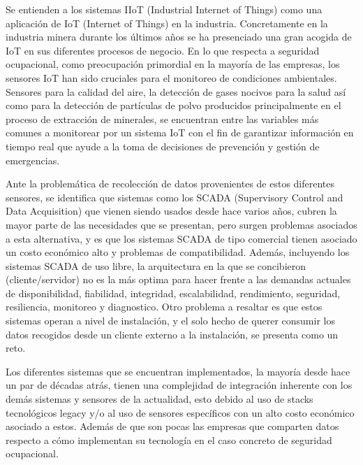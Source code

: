 \documentclass[stu,12pt,floatsintext]{apa7}
\begin{document}
	Se entienden a los sistemas IIoT (Industrial Internet of Things) como una aplicación de IoT (Internet of Things) en la industria. Concretamente en la industria minera durante los últimos años se ha presenciado una gran acogida de IoT en sus diferentes procesos de negocio. En lo que respecta a seguridad ocupacional, como preocupación primordial en la mayoría de las empresas,  los sensores IoT han sido cruciales para el monitoreo de condiciones ambientales. Sensores para la calidad del aire, la detección de gases nocivos para la salud así como para la detección de partículas de polvo producidos principalmente en el proceso de extracción de minerales, se encuentran entre las variables más comunes a monitorear por un sistema IoT con el fin de garantizar información en tiempo real que ayude a la toma de decisiones de prevención y gestión de emergencias\cite{reference-1}.
	
	Ante la problemática de recolección de datos provenientes de estos diferentes sensores, se identifica que sistemas como los SCADA (Supervisory Control and Data Acquisition)  que vienen siendo usados desde hace varios años, cubren la mayor parte de las necesidades que se presentan, pero surgen problemas asociados a esta alternativa, y es que los sistemas SCADA de tipo comercial tienen asociado un costo económico alto y problemas de compatibilidad.  Además, incluyendo los sistemas SCADA de uso libre, la arquitectura en la que se concibieron (cliente/servidor) no es la más optima para hacer frente a las demandas actuales de disponibilidad, fiabilidad, integridad, escalabilidad, rendimiento, seguridad, resiliencia, monitoreo y diagnostico.  Otro problema a resaltar es que estos sistemas operan a nivel de instalación, y el solo hecho de querer consumir los datos recogidos desde un cliente externo a la instalación, se presenta como un reto\cite{electronics8080822}. 
	 
	 Los diferentes sistemas que se encuentran implementados, la mayoría desde hace un par de décadas atrás, tienen una complejidad de integración inherente con los demás sistemas y sensores de la actualidad, esto debido al uso de stacks tecnológicos legacy y/o al uso de sensores específicos con un alto costo económico asociado a estos. Además de que son pocas las empresas que comparten datos respecto a cómo implementan su tecnología en el caso concreto de seguridad ocupacional\cite{iot1020029}.
	 
\end{document}
